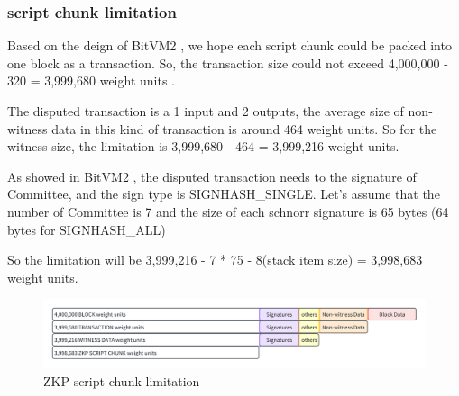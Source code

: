 \subsubsection{script chunk limitation}

Based on the deign of BitVM2 \cite{website:BitVM2}, we hope each script chunk could be packed into one block as a transaction.
So, the transaction size could not exceed 4,000,000 - 320 = 3,999,680 weight units \cite{website:transaction-size}.

The disputed transaction is a 1 input and 2 outputs, the average size of non-witness data in this kind of transaction is around 464 weight units.
So for the witness size, the limitation is 3,999,680 - 464 = 3,999,216 weight units.

As showed in BitVM2 \cite{website:BitVM2}, the disputed transaction needs to the signature of Committee, and the sign type is
SIGNHASH\_SINGLE. Let's assume that the number of Committee is 7 and the size of each schnorr signature is 65 bytes (64 bytes for SIGNHASH\_ALL)

So the limitation will be 3,999,216 - 7 * 75 - 8(stack item size) = 3,998,683 weight units.

\begin{figure}[ht] 
    \centering  
    \includegraphics[width=0.85\columnwidth]{images/ZKP-script-chunk-limitation.png} 
    \caption{ZKP script chunk limitation}
    \label{fig:ZKP-script-chunk-limitation}
\end{figure}
